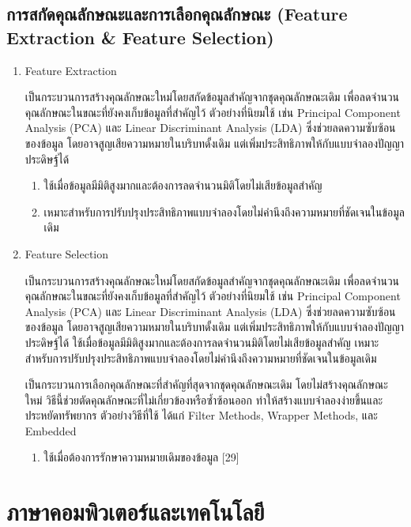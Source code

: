 \documentclass[12pt,oneside,openright,a4paper]{cpe-thai-project}
\begin{document}
\subsection{การสกัดคุณลักษณะและการเลือกคุณลักษณะ (Feature Extraction \& Feature Selection)}
\begin{enumerate}
\item Feature Extraction

		\hspace{2em} เป็นกระบวนการสร้างคุณลักษณะใหม่โดยสกัดข้อมูลสำคัญจากชุดคุณลักษณะเดิม เพื่อลดจำนวนคุณลักษณะในขณะที่ยังคงเก็บข้อมูลที่สำคัญไว้ ตัวอย่างที่นิยมใช้ เช่น Principal Component Analysis (PCA) และ Linear Discriminant Analysis (LDA) 			ซึ่งช่วยลดความซับซ้อนของข้อมูล โดยอาจสูญเสียความหมายในบริบทดั้งเดิม แต่เพิ่มประสิทธิภาพให้กับแบบจำลองปัญญาประดิษฐ์ได้
	
	\begin{enumerate}[label=\alph*.]
		\item ใช้เมื่อข้อมูลมีมิติสูงมากและต้องการลดจำนวนมิติโดยไม่เสียข้อมูลสำคัญ
		\item เหมาะสำหรับการปรับปรุงประสิทธิภาพแบบจำลองโดยไม่คำนึงถึงความหมายที่ชัดเจนในข้อมูลเดิม
	\end{enumerate}
\item Feature Selection

		\hspace{2em} เป็นกระบวนการสร้างคุณลักษณะใหม่โดยสกัดข้อมูลสำคัญจากชุดคุณลักษณะเดิม เพื่อลดจำนวนคุณลักษณะในขณะที่ยังคงเก็บข้อมูลที่สำคัญไว้ ตัวอย่างที่นิยมใช้ เช่น Principal Component Analysis (PCA) และ Linear Discriminant Analysis (LDA) 			ซึ่งช่วยลดความซับซ้อนของข้อมูล โดยอาจสูญเสียความหมายในบริบทดั้งเดิม แต่เพิ่มประสิทธิภาพให้กับแบบจำลองปัญญาประดิษฐ์ได้
	ใช้เมื่อข้อมูลมีมิติสูงมากและต้องการลดจำนวนมิติโดยไม่เสียข้อมูลสำคัญ
	เหมาะสำหรับการปรับปรุงประสิทธิภาพแบบจำลองโดยไม่คำนึงถึงความหมายที่ชัดเจนในข้อมูลเดิม
	
	เป็นกระบวนการเลือกคุณลักษณะที่สำคัญที่สุดจากชุดคุณลักษณะเดิม โดยไม่สร้างคุณลักษณะใหม่ วิธีนี้ช่วยตัดคุณลักษณะที่ไม่เกี่ยวข้องหรือซ้ำซ้อนออก ทำให้สร้างแบบจำลองง่ายขึ้นและประหยัดทรัพยากร ตัวอย่างวิธีที่ใช้ ได้แก่ Filter Methods, Wrapper Methods, และ Embedded 
	\begin{enumerate}[label=\alph*.]
		\item ใช้เมื่อต้องการรักษาความหมายเดิมของข้อมูล [29]
	\end{enumerate}
	
\end{enumerate}

\section{ภาษาคอมพิวเตอร์และเทคโนโลยี}
\end{document}
